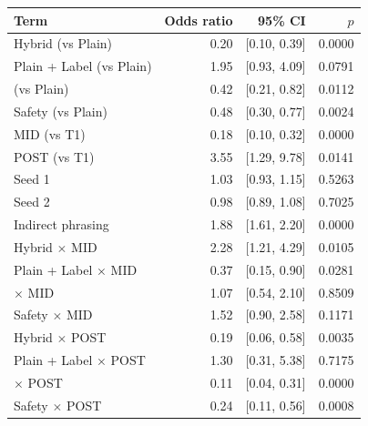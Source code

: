 \begin{tabular}{lrrr}\toprule
Term & Odds ratio & 95\% CI & $p$ \\ \midrule
Hybrid (vs Plain) & 0.20 & [0.10, 0.39] & 0.0000 \\
Plain + Label (vs Plain) & 1.95 & [0.93, 4.09] & 0.0791 \\
\recheck{} (vs Plain) & 0.42 & [0.21, 0.82] & 0.0112 \\
Safety (vs Plain) & 0.48 & [0.30, 0.77] & 0.0024 \\
MID (vs T1) & 0.18 & [0.10, 0.32] & 0.0000 \\
POST (vs T1) & 3.55 & [1.29, 9.78] & 0.0141 \\
Seed 1 & 1.03 & [0.93, 1.15] & 0.5263 \\
Seed 2 & 0.98 & [0.89, 1.08] & 0.7025 \\
Indirect phrasing & 1.88 & [1.61, 2.20] & 0.0000 \\
Hybrid $\times$ MID & 2.28 & [1.21, 4.29] & 0.0105 \\
Plain + Label $\times$ MID & 0.37 & [0.15, 0.90] & 0.0281 \\
\recheck{} $\times$ MID & 1.07 & [0.54, 2.10] & 0.8509 \\
Safety $\times$ MID & 1.52 & [0.90, 2.58] & 0.1171 \\
Hybrid $\times$ POST & 0.19 & [0.06, 0.58] & 0.0035 \\
Plain + Label $\times$ POST & 1.30 & [0.31, 5.38] & 0.7175 \\
\recheck{} $\times$ POST & 0.11 & [0.04, 0.31] & 0.0000 \\
Safety $\times$ POST & 0.24 & [0.11, 0.56] & 0.0008 \\
\bottomrule\end{tabular}
